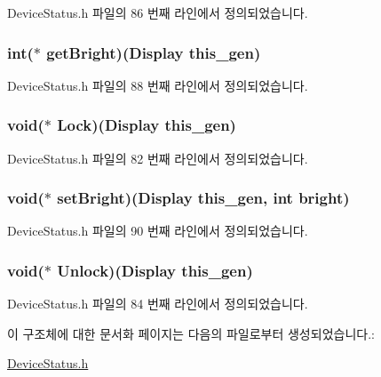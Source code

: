 Device\-Status.\-h 파일의 86 번째 라인에서 정의되었습니다.

\hypertarget{struct___display_a61cbbbd330281072786ca6289de92a3a}{
\subsubsection[{get\-Bright}]{\setlength{\rightskip}{0pt plus 5cm}int($\ast$  get\-Bright)({\bf Display} this\-\_\-gen)}}\label{struct___display_a61cbbbd330281072786ca6289de92a3a}


Device\-Status.\-h 파일의 88 번째 라인에서 정의되었습니다.

\hypertarget{struct___display_a8ebb33d01cded0db9f4bcdbcf44e90d0}{
\subsubsection[{Lock}]{\setlength{\rightskip}{0pt plus 5cm}void($\ast$  Lock)({\bf Display} this\-\_\-gen)}}\label{struct___display_a8ebb33d01cded0db9f4bcdbcf44e90d0}


Device\-Status.\-h 파일의 82 번째 라인에서 정의되었습니다.

\hypertarget{struct___display_acb57f785b1df759aa711224a445c004f}{
\subsubsection[{set\-Bright}]{\setlength{\rightskip}{0pt plus 5cm}void($\ast$  set\-Bright)({\bf Display} this\-\_\-gen, int bright)}}\label{struct___display_acb57f785b1df759aa711224a445c004f}


Device\-Status.\-h 파일의 90 번째 라인에서 정의되었습니다.

\hypertarget{struct___display_a2997a5ca8fcbf98731edc07b55919203}{
\subsubsection[{Unlock}]{\setlength{\rightskip}{0pt plus 5cm}void($\ast$  Unlock)({\bf Display} this\-\_\-gen)}}\label{struct___display_a2997a5ca8fcbf98731edc07b55919203}


Device\-Status.\-h 파일의 84 번째 라인에서 정의되었습니다.



이 구조체에 대한 문서화 페이지는 다음의 파일로부터 생성되었습니다.\-:\begin{DoxyCompactItemize}
\item 
\hyperlink{_device_status_8h}{Device\-Status.\-h}\end{DoxyCompactItemize}
